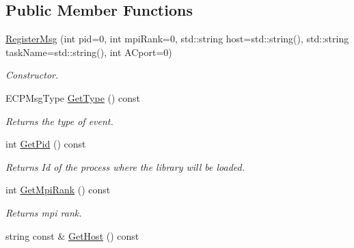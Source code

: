 \subsection*{Public Member Functions}
\begin{DoxyCompactItemize}
\item 
\hyperlink{class_common_1_1_register_msg_ab97869aa4d99b10fad4df118f91784eb}{Register\-Msg} (int pid=0, int mpi\-Rank=0, std\-::string host=std\-::string(), std\-::string task\-Name=std\-::string(), int A\-Cport=0)
\begin{DoxyCompactList}\small\item\em Constructor. \end{DoxyCompactList}\item 
\hypertarget{class_common_1_1_register_msg_a307245b2ff871bf0e4d8167b3773eaff}{E\-C\-P\-Msg\-Type \hyperlink{class_common_1_1_register_msg_a307245b2ff871bf0e4d8167b3773eaff}{Get\-Type} () const }\label{class_common_1_1_register_msg_a307245b2ff871bf0e4d8167b3773eaff}

\begin{DoxyCompactList}\small\item\em Returns the type of event. \end{DoxyCompactList}\item 
\hypertarget{class_common_1_1_register_msg_a21510f554bed14f14c600da80d6cc030}{int \hyperlink{class_common_1_1_register_msg_a21510f554bed14f14c600da80d6cc030}{Get\-Pid} () const }\label{class_common_1_1_register_msg_a21510f554bed14f14c600da80d6cc030}

\begin{DoxyCompactList}\small\item\em Returns Id of the process where the library will be loaded. \end{DoxyCompactList}\item 
\hypertarget{class_common_1_1_register_msg_a931519d8c96b3af0408b274f23ec7d01}{int \hyperlink{class_common_1_1_register_msg_a931519d8c96b3af0408b274f23ec7d01}{Get\-Mpi\-Rank} () const }\label{class_common_1_1_register_msg_a931519d8c96b3af0408b274f23ec7d01}

\begin{DoxyCompactList}\small\item\em Returns mpi rank. \end{DoxyCompactList}\item 
\hypertarget{class_common_1_1_register_msg_a6a84fcf95b5e4a616fbe52b6c807bf68}{string const \& \hyperlink{class_common_1_1_register_msg_a6a84fcf95b5e4a616fbe52b6c807bf68}{Get\-Host} () const }\label{class_common_1_1_register_msg_a6a84fcf95b5e4a616fbe52b6c807bf68}


\end{DoxyCompactItemize}
